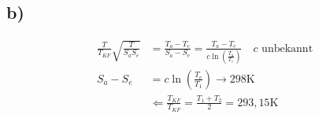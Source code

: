 

\subsection*{b)}
\begin{align*}
    \frac{T}{T_{KF}} \sqrt{\frac{T}{S_a S_e}} &= \frac{T_a - T_e}{S_a - S_e} = \frac{T_a - T_e}{c \ln \left( \frac{T_a}{T_e} \right)} \quad c \text{ unbekannt} \\
    S_a - S_e &= c \ln \left( \frac{T_e}{T_1} \right) \rightarrow 298 \text{K} \\
    &\Longleftarrow \frac{T_{KF}}{T_{KF}} = \frac{T_1 + T_2}{2} = 293,15 \text{K}
\end{align*}